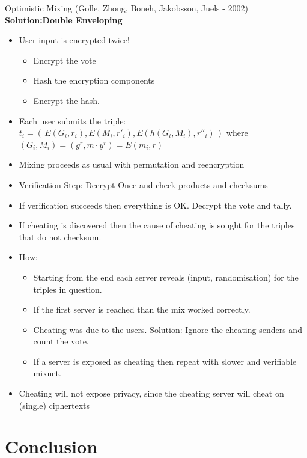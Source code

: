 \documentclass{beamer}
\newcommand*{\addsp}{\usebeamertemplate*{section page1}}
\begin{document}
\begin{frame}[allowframebreaks]{Optimistic Mixing (Golle, Zhong, Boneh, Jakobsson, Juels - 2002)}
\textbf{Solution:Double Enveloping}
\begin{itemize}
\item User input is encrypted twice!
\begin{itemize}
\item Encrypt the vote
\item Hash the encryption components
\item Encrypt the hash.
\end{itemize}
\item Each user submits the triple: $ t_i = ( \, E(G_i,r_i), E(M_i,r'_i), E(h(G_i,M_i),r''_i) \, )$  where $(G_i,M_i) = (g^{r},m \cdot y^{r}) = E(m_i,r)$
\item Mixing proceeds as usual with permutation and reencryption
\item Verification Step: Decrypt Once and check products and checksums
\item If verification succeeds then everything is OK. Decrypt the vote and tally.
\item If cheating is discovered then the cause of cheating is sought for the triples that do not checksum.
\item How: 
\begin{itemize}
\item Starting from the end each server reveals  (input, randomisation) for the triples in question.
\item If the first server is reached than the mix worked correctly.
\item Cheating was due to the users. Solution: Ignore the cheating senders and count the vote.
\item If a server is exposed as cheating then repeat with slower and verifiable mixnet.
\end{itemize}
\item Cheating will not expose privacy, since the cheating server will cheat on (single) ciphertexts
\end{itemize}
 
\end{frame}

\section{Conclusion}
\begin{frame}
\addsp
\end{frame}
\end{document}
